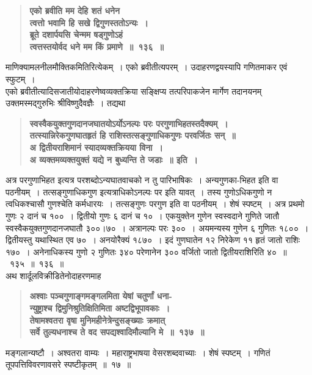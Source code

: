 \documentclass[11pt, openany]{book}
\begin{document}
\newpage

\begin{sloppypar}
 \label{9.136}
\begin{quote}
{\large \textbf{{\color{purple}एको ब्रवीति मम देहि शतं धनेन\\
त्वत्तो भवामि हि सखे द्विगुणस्ततोऽन्यः~।\\
ब्रूते दशार्पयसि चेन्मम षड्गुणोऽहं\\
त्वत्तस्तयोर्वद धने मम किं प्रमाणे~॥~१३६~॥}}}
\end{quote}

माणिक्यामलनीलमौक्तिकमितिरित्येकम्~। एको ब्रवीतीत्यपरम्~। उदाहरणद्वयस्यापि गणितमाकर एवं स्फुटम्~।\\

{\small एको ब्रवीतीत्यादिसजातीयोदाहरणेष्वव्यक्तक्रिया सङ्क्षिप्य तत्परिपाकजेन मार्गेण तदानयनम् उक्तमस्मद्गुरुभिः {\color{violet}श्रीविष्णुदैवज्ञैः}~। तद्यथा\textendash }

\begin{quote}
\textbf{{\color{violet}स्वस्वैकयुक्तगुणदानजघातयोऽर्योऽनल्पः परः परगुणाभिहतस्तदैक्यम्~।\\
तत्स्यान्निरेकगुणघातहृतं हि राशिस्तत्सङ्गुणाधिकगुणः परवर्जितः सन्~॥\\
{\color{white}अ} \hspace{10mm} द्वितीयराशिमानं स्यादव्यक्तक्रियया विना~।\\
{\color{white}अ} \hspace{10mm} व्यक्तमव्यक्तयुक्तं यद्ये न बुध्यन्ति ते जडाः~॥} इति~।}
\end{quote}

अत्र परगुणाभिहत इत्यत्र परशब्दोऽन्यघातवाचको न तु पारिभाषिकः~। अन्यगुणका-भिहत इति वा पठनीयम्~। तत्सङ्गुणाधिकगुण इत्यत्राधिकोऽनल्पः पर इति यावत्~। तस्य गुणोऽधिकगुणो न त्वधिकश्चासौ गुणश्चेति कर्मधारयः~। तत्सङ्गुणः परगुण इति वा पठनीयम्~। शेषं स्पष्टम्~। अत्र प्रथमो गुणः २ दानं च १००~। द्वितीयो गुणः ६ दानं च १०~। एकयुक्तेन गुणेन स्वस्वदाने गुणिते जातौ स्वस्वैकयुक्तगुणदानजघातौ ३००।७०~। अत्रानल्पः परः ३००~। अयमन्यस्य गुणेन ६ गुणितः १८००~। द्वितीयस्तु यथास्थित एव ७०~। अनयोरैक्यं १८७०~। इदं गुणघातेन १२ निरेकेण ११ हृतं जातो राशिः १७०~। अनेनाधिकस्य गुणो २ गुणितः ३४० परेणानेन ३०० वर्जितो जातो द्वितीयराशिरिति ४०~॥~१३५~॥~१३६~॥\\

{\small अथ शार्दूलविक्रीडितेनोदाहरणमाह\textendash }

 \label{9.137}
\begin{quote}
{\large \textbf{{\color{purple}अश्वाः पञ्चगुणाङ्गमङ्गलमिता येषां चतुर्णां धना-\\
न्युष्ट्राश्च द्विमुनिश्रुतिक्षितिमिता अष्टद्विभूपावकाः~।\\
तेषामश्वतरा वृषा मुनिमहीनेत्रेन्दुसङ्ख्याः क्रमात्\\
सर्वे तुल्यधनाश्च ते वद सपद्यश्वादिमौल्यानि मे~॥~१३७~॥}}}
\end{quote}

मङ्गलान्यष्टौ~। अश्वतरा वाम्यः~। महाराष्ट्रभाषया वेसरशब्दवाच्याः~। शेषं स्पष्टम्~। गणितं तूपपत्तिविवरणावसरे स्पष्टीकृतम्~॥~१७~॥
\end{sloppypar}
\end{document}
